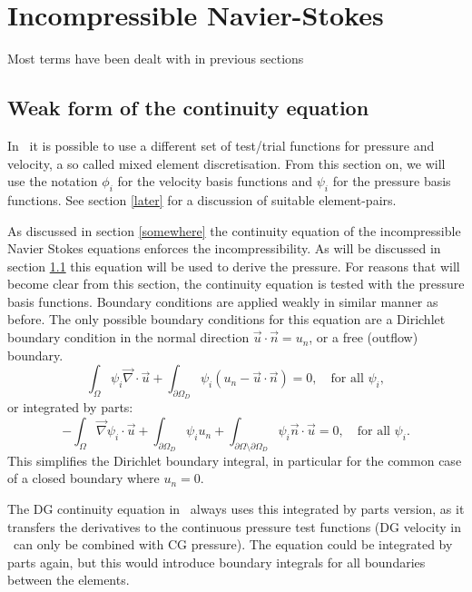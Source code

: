 \section{Incompressible Navier-Stokes}
Most terms have been dealt with in
previous sections

\subsection{Weak form of the continuity equation}
In \fluidity\ it is possible to use a different set of test/trial 
functions for pressure and velocity, a so called mixed element discretisation. 
From this section on, we will use the notation $\phi_i$ for the velocity 
basis functions and $\psi_i$ for the pressure basis functions.
See section \ref{later} for a discussion of suitable element-pairs.

As discussed in section \ref{somewhere} the continuity equation of the incompressible Navier 
Stokes equations enforces the incompressibility. As will be discussed in section \ref{}
this equation will be used to derive the pressure. For reasons that will become clear
from this section, the continuity equation is tested with the pressure basis 
functions. Boundary conditions are applied weakly in similar manner as 
before. The only possible boundary conditions for this equation are a 
Dirichlet boundary condition in the normal direction $\vec u\cdot\vec n=u_n$, 
or a free (outflow) boundary.
\begin{equation*}
  \int_\Omega \psi_i \vec\nabla \cdot \vec u
    + \int_{\partial\Omega_D} \psi_i\left(u_n-\vec u\cdot \vec n\right)
    = 0,\quad
    \text{for all } \psi_i,
\end{equation*}
or integrated by parts:
\begin{equation*}
  -\int_\Omega \vec\nabla\psi_i \cdot \vec u
  + \int_{\partial\Omega_D} \psi_i u_n
  + \int_{\partial\Omega\setminus\partial\Omega_D} \psi_i\vec n\cdot \vec u
  = 0,\quad
  \text{for all } \psi_i.
\end{equation*}
This simplifies the Dirichlet boundary integral, in particular for the common 
case of a closed boundary where $u_n=0$. 

The DG continuity equation in \fluidity\ always uses
this integrated by parts version, as it transfers the derivatives to the continuous 
pressure test functions (DG velocity in \fluidity\ can only be combined with CG pressure). The 
equation could be integrated by parts again, but this would introduce boundary integrals for all
boundaries between the elements.

